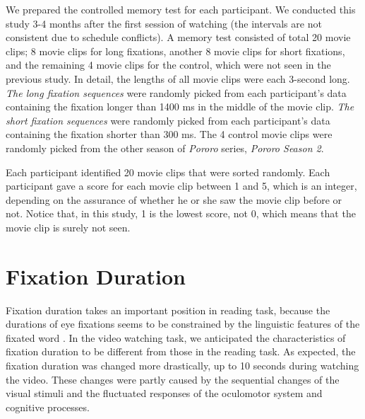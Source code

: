 \documentclass[10pt,letterpaper]{article}
\begin{document}
We prepared the controlled memory test for each participant. We conducted this study 3-4 months after the first session of watching (the intervals are not consistent due to schedule conflicts). A memory test consisted of total 20 movie clips; 8 movie clips for long fixations, another 8 movie clips for short fixations, and the remaining 4 movie clips for the control, which were not seen in the previous study. In detail, the lengths of all movie clips were each 3-second long. \textit{The long fixation sequences} were randomly picked from each participant's data containing the fixation longer than 1400 ms in the middle of the movie clip. \textit{The short fixation sequences} were randomly picked from each participant's data containing the fixation shorter than 300 ms. The 4 control movie clips were randomly picked from the other season of \textit{Pororo} series, \textit{Pororo Season 2}.

Each participant identified 20 movie clips that were sorted randomly. Each participant gave a score for each movie clip between 1 and 5, which is an integer, depending on the assurance of whether he or she saw the movie clip before or not. Notice that, in this study, 1 is the lowest score, not 0, which means that the movie clip is surely not seen.



\section{Fixation Duration}
\label{sec:fixation-duration}
\label{subsec:Long-Fixation-Durations}

Fixation duration takes an important position in reading task, because the durations of eye fixations seems to be constrained by the linguistic features of the fixated word \cite{Rayner1986,Inhoff1986}. In the video watching task, we anticipated the characteristics of fixation duration to be different from those in the reading task. As expected, the fixation duration was changed more drastically, up to 10 seconds during watching the video. These changes were partly caused by the sequential changes of the visual stimuli and the fluctuated responses of the oculomotor system and cognitive processes.
\end{document}
